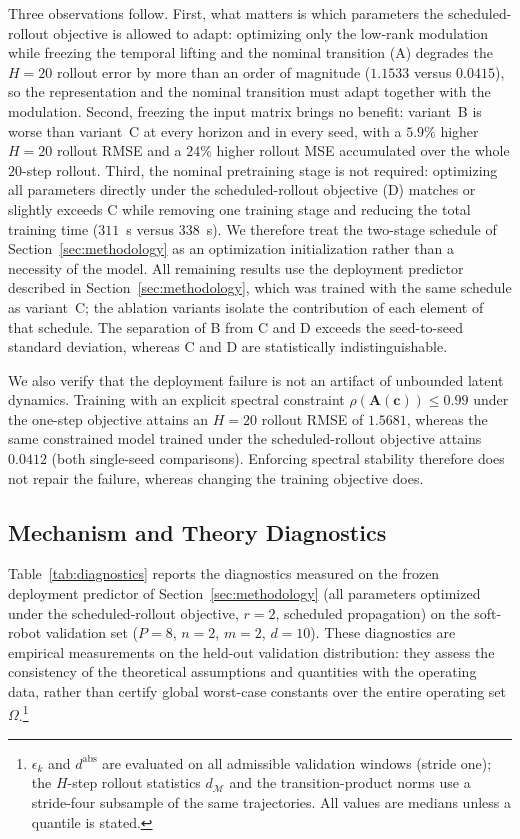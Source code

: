 \documentclass[journal]{IEEEtran}
\newcommand{\mA}{\mathbf{A}}
\newcommand{\vc}{\mathbf{c}}
\begin{document}
Three observations follow. First, what matters is which parameters the scheduled-rollout objective is allowed to adapt: optimizing only the low-rank modulation while freezing the temporal lifting and the nominal transition (A) degrades the $H=20$ rollout error by more than an order of magnitude ($1.1533$ versus $0.0415$), so the representation and the nominal transition must adapt together with the modulation. Second, freezing the input matrix brings no benefit: variant~B is worse than variant~C at every horizon and in every seed, with a $5.9\%$ higher $H=20$ rollout RMSE and a $24\%$ higher rollout MSE accumulated over the whole $20$-step rollout. Third, the nominal pretraining stage is not required: optimizing all parameters directly under the scheduled-rollout objective (D) matches or slightly exceeds C while removing one training stage and reducing the total training time ($311$~s versus $338$~s). We therefore treat the two-stage schedule of Section~\ref{sec:methodology} as an optimization initialization rather than a necessity of the model. All remaining results use the deployment predictor described in Section~\ref{sec:methodology}, which was trained with the same schedule as variant~C; the ablation variants isolate the contribution of each element of that schedule. The separation of B from C and D exceeds the seed-to-seed standard deviation, whereas C and D are statistically indistinguishable.

We also verify that the deployment failure is not an artifact of unbounded latent dynamics. Training with an explicit spectral constraint $\rho(\mA(\vc))\le0.99$ under the one-step objective attains an $H=20$ rollout RMSE of $1.5681$, whereas the same constrained model trained under the scheduled-rollout objective attains $0.0412$ (both single-seed comparisons). Enforcing spectral stability therefore does not repair the failure, whereas changing the training objective does.

\subsection{Mechanism and Theory Diagnostics}
\label{subsec:diagnostics}

Table~\ref{tab:diagnostics} reports the diagnostics measured on the frozen deployment predictor of Section~\ref{sec:methodology} (all parameters optimized under the scheduled-rollout objective, $r=2$, scheduled propagation) on the soft-robot validation set ($P=8$, $n=2$, $m=2$, $d=10$). These diagnostics are empirical measurements on the held-out validation distribution: they assess the consistency of the theoretical assumptions and quantities with the operating data, rather than certify global worst-case constants over the entire operating set $\Omega$.\footnote{$\epsilon_k$ and $d^{\mathrm{abs}}$ are evaluated on all admissible validation windows (stride one); the $H$-step rollout statistics $d_{\mathcal M}$ and the transition-product norms use a stride-four subsample of the same trajectories. All values are medians unless a quantile is stated.}
\end{document}
